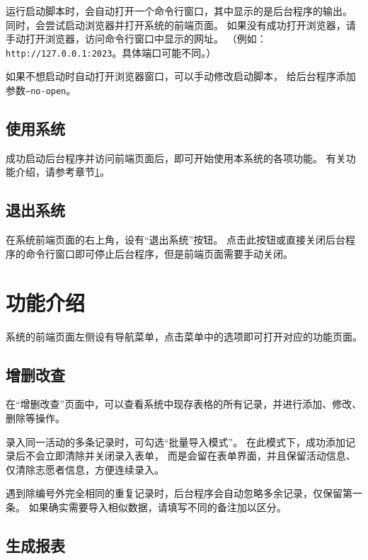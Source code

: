 \documentclass[12pt,titlepage]{article}
\begin{document}
运行启动脚本时，会自动打开一个命令行窗口，其中显示的是后台程序的输出。
同时，会尝试启动浏览器并打开系统的前端页面。
如果没有成功打开浏览器，请手动打开浏览器，访问命令行窗口中显示的网址。
（例如：\nolinkurl{http://127.0.0.1:2023}。具体端口可能不同。）

如果不想启动时自动打开浏览器窗口，可以手动修改启动脚本，
给后台程序添加参数\texttt{--no-open}。

\subsection{使用系统}

成功启动后台程序并访问前端页面后，即可开始使用本系统的各项功能。
有关功能介绍，请参考章节\ref{sec:functionalities}。

\subsection{退出系统}

在系统前端页面的右上角，设有“退出系统”按钮。
点击此按钮或直接关闭后台程序的命令行窗口即可停止后台程序，但是前端页面需要手动关闭。

\newpage
\section{功能介绍}
\label{sec:functionalities}

系统的前端页面左侧设有导航菜单，点击菜单中的选项即可打开对应的功能页面。

\subsection{增删改查}

在“增删改查”页面中，可以查看系统中现存表格的所有记录，并进行添加、修改、删除等操作。

录入同一活动的多条记录时，可勾选“批量导入模式”。
在此模式下，成功添加记录后不会立即清除并关闭录入表单，
而是会留在表单界面，并且保留活动信息、仅清除志愿者信息，方便连续录入。

\begin{warnings}
    \item 遇到除编号外完全相同的重复记录时，后台程序会自动忽略多余记录，仅保留第一条。
    如果确实需要导入相似数据，请填写不同的备注加以区分。
\end{warnings}

\subsection{生成报表}
\end{document}
